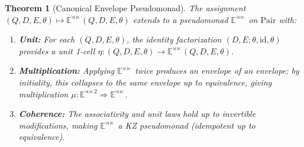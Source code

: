 \documentclass[11pt]{article}
\theoremstyle{plain}
\newtheorem{theorem}{Theorem}[section]
\theoremstyle{definition}
\theoremstyle{remark}
\newcommand{\id}{\mathrm{id}}
\newcommand{\Pair}{\mathrm{Pair}}
\begin{document}
\begin{theorem}[Canonical Envelope Pseudomonad]
The assignment $(Q, D, E, \theta) \mapsto \mathbb{E}^{\rtimes \ltimes}(Q, D, E, \theta)$ extends to a pseudomonad $\mathbb{E}^{\rtimes \ltimes}$ on $\Pair$ with:

\begin{enumerate}
\item \textbf{Unit:} For each $(Q, D, E, \theta)$, the identity factorization $(D, E; \theta, \id, \theta)$ provides a unit 1-cell $\eta : (Q, D, E, \theta) \to \mathbb{E}^{\rtimes \ltimes}(Q, D, E, \theta)$.

\item \textbf{Multiplication:} Applying $\mathbb{E}^{\rtimes \ltimes}$ twice produces an envelope of an envelope; by initiality, this collapses to the same envelope up to equivalence, giving multiplication $\mu : \mathbb{E}^{\rtimes \ltimes 2} \Rightarrow \mathbb{E}^{\rtimes \ltimes}$.

\item \textbf{Coherence:} The associativity and unit laws hold up to invertible modifications, making $\mathbb{E}^{\rtimes \ltimes}$ a KZ pseudomonad (idempotent up to equivalence).
\end{enumerate}
\end{theorem}
\end{document}
